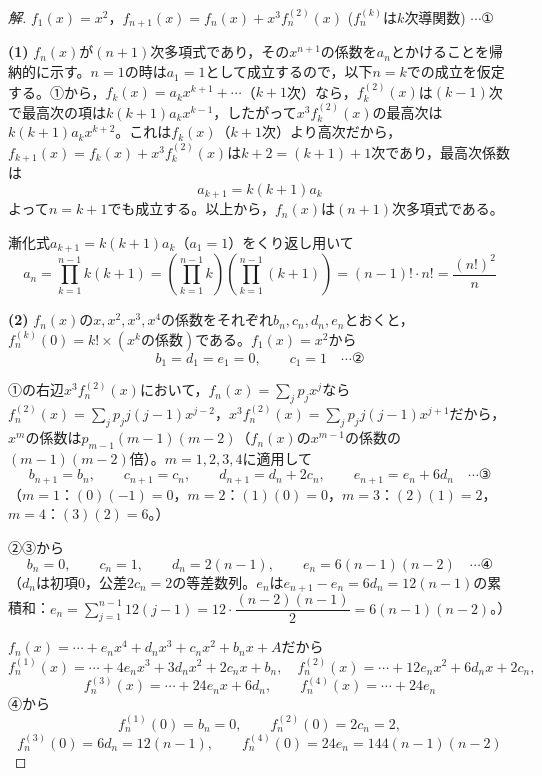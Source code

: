 \documentclass[../main.tex]{subfiles}
\begin{document}
\begin{proof}[解]
  $f_1(x)=x^2$，$f_{n+1}(x)=f_n(x)+x^3f_n^{(2)}(x)$ ($f_n^{(k)}$は$k$次導関数) $\cdots$①

  \textbf{(1)} $f_n(x)$が$(n+1)$次多項式であり，その$x^{n+1}$の係数を$a_n$とかけることを帰納的に示す。$n=1$の時は$a_1=1$として成立するので，以下$n=k$での成立を仮定する。①から，$f_k(x)=a_kx^{k+1}+\cdots$（$k+1$次）なら，$f_k^{(2)}(x)$は$(k-1)$次で最高次の項は$k(k+1)a_kx^{k-1}$，したがって$x^3f_k^{(2)}(x)$の最高次は$k(k+1)a_kx^{k+2}$。これは$f_k(x)$（$k+1$次）より高次だから，$f_{k+1}(x)=f_k(x)+x^3f_k^{(2)}(x)$は$k+2=(k+1)+1$次であり，最高次係数は
  \[
    a_{k+1}=k(k+1)a_k
  \]
  よって$n=k+1$でも成立する。以上から，$f_n(x)$は$(n+1)$次多項式である。

  漸化式$a_{k+1}=k(k+1)a_k$（$a_1=1$）をくり返し用いて
  \[
    a_n=\prod_{k=1}^{n-1}k(k+1)=\left(\prod_{k=1}^{n-1}k\right)\left(\prod_{k=1}^{n-1}(k+1)\right)=(n-1)!\cdot n!=\frac{(n!)^2}n
  \]

  \textbf{(2)} $f_n(x)$の$x,x^2,x^3,x^4$の係数をそれぞれ$b_n,c_n,d_n,e_n$とおくと，$f_n^{(k)}(0)=k!\times(x^k\text{の係数})$である。$f_1(x)=x^2$から
  \[
    b_1=d_1=e_1=0,\qquad c_1=1 \quad\cdots\text{②}
  \]

  ①の右辺$x^3f_n^{(2)}(x)$において，$f_n(x)=\sum_jp_jx^j$なら$f_n^{(2)}(x)=\sum_jp_jj(j-1)x^{j-2}$，$x^3f_n^{(2)}(x)=\sum_jp_jj(j-1)x^{j+1}$だから，$x^m$の係数は$p_{m-1}(m-1)(m-2)$（$f_n(x)$の$x^{m-1}$の係数の$(m-1)(m-2)$倍）。$m=1,2,3,4$に適用して
  \[
    b_{n+1}=b_n,\qquad c_{n+1}=c_n,\qquad d_{n+1}=d_n+2c_n,\qquad e_{n+1}=e_n+6d_n \quad\cdots\text{③}
  \]
  （$m=1$：$(0)(-1)=0$，$m=2$：$(1)(0)=0$，$m=3$：$(2)(1)=2$，$m=4$：$(3)(2)=6$。）

  ②③から
  \[
    b_n=0,\qquad c_n=1,\qquad d_n=2(n-1),\qquad e_n=6(n-1)(n-2) \quad\cdots\text{④}
  \]
  （$d_n$は初項$0$，公差$2c_n=2$の等差数列。$e_n$は$e_{n+1}-e_n=6d_n=12(n-1)$の累積和：$e_n=\sum_{j=1}^{n-1}12(j-1)=12\cdot\dfrac{(n-2)(n-1)}2=6(n-1)(n-2)$。）

  $f_n(x)=\cdots+e_nx^4+d_nx^3+c_nx^2+b_nx+A$だから
  \[
    f_n^{(1)}(x)=\cdots+4e_nx^3+3d_nx^2+2c_nx+b_n,\quad f_n^{(2)}(x)=\cdots+12e_nx^2+6d_nx+2c_n,
  \]
  \[
    f_n^{(3)}(x)=\cdots+24e_nx+6d_n,\qquad f_n^{(4)}(x)=\cdots+24e_n
  \]
  ④から
  \[
    f_n^{(1)}(0)=b_n=0,\qquad f_n^{(2)}(0)=2c_n=2,
  \]
  \[
    f_n^{(3)}(0)=6d_n=12(n-1),\qquad f_n^{(4)}(0)=24e_n=144(n-1)(n-2)
  \]
\end{proof}
\end{document}
